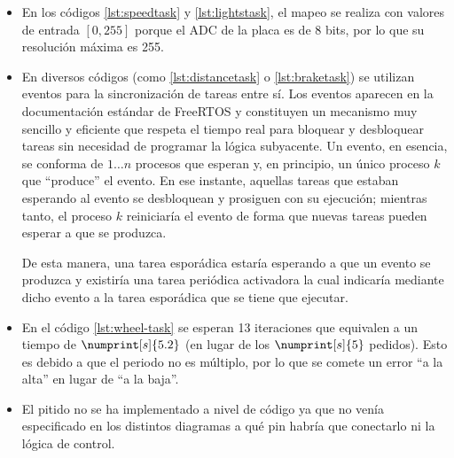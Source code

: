\begin{itemize}
  \item En los códigos \ref{lst:speedtask} y \ref{lst:lightstask}, el mapeo se realiza con valores
        de entrada $\left[0, 255\right]$ porque el ADC de la placa
        es de 8 bits, por lo que su resolución máxima es 255.
  \item En diversos códigos (como \ref{lst:distancetask} o \ref{lst:braketask}) se
        utilizan eventos para la sincronización de tareas entre sí. Los eventos
        aparecen en la documentación estándar de FreeRTOS y constituyen un mecanismo
        muy sencillo y eficiente que respeta el tiempo real para bloquear y desbloquear
        tareas sin necesidad de programar la lógica subyacente. Un evento, en esencia,
        se conforma de $1 \dots n$ procesos que esperan y, en principio, un único proceso
        $k$ que ``produce'' el evento. En ese instante, aquellas tareas que estaban
        esperando al evento se desbloquean y prosiguen con su ejecución; mientras tanto,
        el proceso $k$ reiniciaría el evento de forma que nuevas tareas pueden esperar
        a que se produzca.

        De esta manera, una tarea esporádica estaría esperando a que un evento se
        produzca y existiría una tarea periódica activadora la cual indicaría
        mediante dicho evento a la tarea esporádica que se tiene que ejecutar.
  \item En el código \ref{lst:wheel-task} se esperan 13 iteraciones que equivalen a un
        tiempo de $\numprint[s]{5.2}$ (en lugar de los $\numprint[s]{5}$ pedidos). Esto
        es debido a que el periodo no es múltiplo, por lo que se comete un error
        ``a la alta'' en lugar de ``a la baja''.
  \item El pitido no se ha implementado a nivel de código ya que no venía especificado
        en los distintos diagramas a qué pin habría que conectarlo ni la lógica de
        control.
\end{itemize}